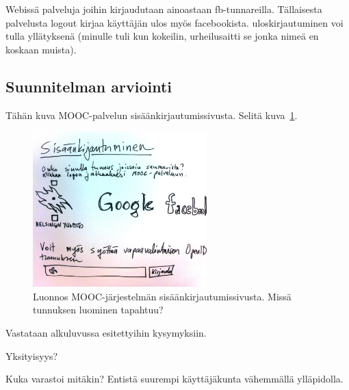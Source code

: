 \documentclass[finnish,gradu]{tktltiki}
\begin{document}
  Webissä palveluja joihin kirjaudutaan ainoastaan fb-tunnareilla. Tällaisesta palvelusta logout kirjaa käyttäjän ulos myös facebookista. uloskirjautuminen voi tulla yllätyksenä (minulle tuli kun kokeilin, urheilusaitti se jonka nimeä en koskaan muista).




  \subsection{Suunnitelman arviointi} %
  \label{sub:suunnitelman_arviointi}

  Tähän kuva MOOC-palvelun sisäänkirjautumissivusta. Selitä kuva~\ref{fig:mooc_login_luonnos}.
  \begin{figure}
    \centering
    \includegraphics[width=0.6\textwidth]{images/mooc_login_sketch.jpg}
    \caption{Luonnos MOOC-järjestelmän sisäänkirjautumissivusta. Missä tunnuksen luominen tapahtuu?}
    \label{fig:mooc_login_luonnos}
  \end{figure}

  Vastataan alkuluvussa esitettyihin kysymyksiin.


  Yksityisyys? %

  Kuka varastoi mitäkin? Entistä suurempi käyttäjäkunta vähemmällä ylläpidolla.
\end{document}

